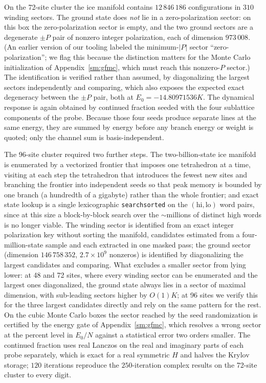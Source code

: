 \documentclass[aps,prl,twocolumn,amsmath,amssymb,superscriptaddress,
longbibliography,floatfix]{revtex4-2}
\begin{document}
On the 72-site cluster the ice manifold contains $12\,846\,186$
configurations in $310$ winding sectors. The ground state does
\emph{not} lie in a zero-polarization sector: on this box the
zero-polarization sector is empty, and the two ground sectors are a
degenerate $\pm P$ pair of nonzero integer polarization, each of
dimension $973\,008$. (An earlier version of our tooling labeled the
minimum-$|P|$ sector ``zero-polarization''; we flag this because the
distinction matters for the Monte Carlo initialization of
Appendix~\ref{sm:gfmc}, which must reach this nonzero-$P$ sector.)
The identification is verified rather than assumed, by diagonalizing
the largest sectors independently and comparing, which also exposes
the expected exact degeneracy between the $\pm P$ pair, both at $E_0=-14.80971536K$. The dynamical response is again
obtained by continued fraction seeded with the four sublattice
components of the probe. Because those four seeds produce separate
lines at the same energy, they are summed by energy before any branch
energy or weight is quoted; only the channel sum is
basis-independent.

The 96-site cluster required two further steps. The two-billion-state
ice manifold is enumerated by a vectorized frontier that imposes one
tetrahedron at a time, visiting at each step the tetrahedron that
introduces the fewest new sites and branching the frontier into
independent seeds so that peak memory is bounded by one branch
(a hundredth of a gigabyte) rather than the whole frontier; and exact
state lookup is a single lexicographic \texttt{searchsorted} on the
$(\mathrm{hi},\mathrm{lo})$ word pairs, since at this size a
block-by-block search over the $\sim$millions of distinct high words
is no longer viable. The winding sector is identified from an exact
integer polarization key without sorting the manifold, candidates
estimated from a four-million-state sample and each extracted in one
masked pass; the ground sector (dimension $146\,758\,352$, $2.7\times
10^{9}$ nonzeros) is identified by diagonalizing the largest
candidates and comparing. What excludes a smaller sector from lying
lower: at 48 and 72 sites, where every winding sector can be
enumerated and the largest ones diagonalized, the ground state always
lies in a sector of maximal dimension, with sub-leading sectors
higher by $O(1)K$; at 96 sites we verify this for the three largest
candidates directly and rely on the same pattern for the rest. On the
cubic Monte Carlo boxes the sector reached by the seed randomization
is certified by the energy gate of Appendix~\ref{sm:gfmc}, which
resolves a wrong sector at the percent level in $E_0/N$ against a
statistical error two orders smaller. The continued fraction uses real Lanczos on
the real and imaginary parts of each probe separately, which is exact
for a real symmetric $H$ and halves the Krylov storage; $120$
iterations reproduce the $250$-iteration complex results on the
72-site cluster to every digit.
\end{document}
